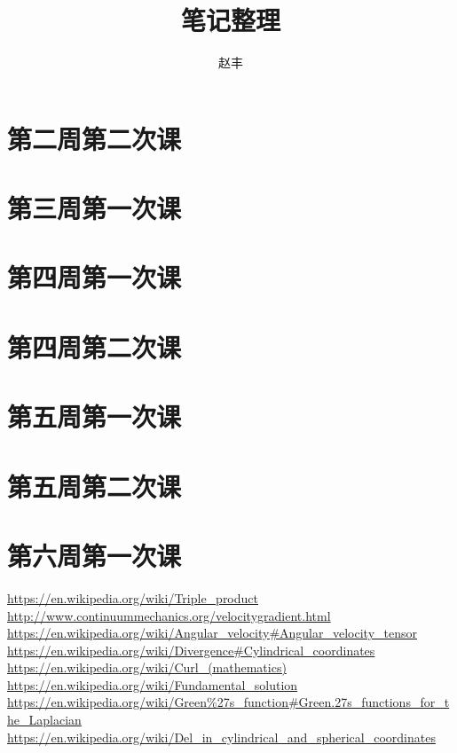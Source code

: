 \documentclass{article}
\numberwithin{equation}{section}
\begin{document}
\title{笔记整理}
\author{赵丰}
\maketitle
\tableofcontents
\section{第二周第二次课}

\section{第三周第一次课}

\section{第四周第一次课}

\section{第四周第二次课}

\section{第五周第一次课}

\section{第五周第二次课}

\section{第六周第一次课}

\begin{thebibliography}{9}
 \href{https://en.wikipedia.org/wiki/Triple_product}{https://en.wikipedia.org/wiki/Triple\_product}
\href{http://www.continuummechanics.org/velocitygradient.html}{http://www.continuummechanics.org/velocitygradient.html}
\href{https://en.wikipedia.org/wiki/Angular_velocity#Angular_velocity_tensor}{https://en.wikipedia.org/wiki/Angular\_velocity\#Angular\_velocity\_tensor}
\href{https://en.wikipedia.org/wiki/Divergence#Cylindrical_coordinates}{https://en.wikipedia.org/wiki/Divergence\#Cylindrical\_coordinates}
\href{https://en.wikipedia.org/wiki/Curl_(mathematics)}{https://en.wikipedia.org/wiki/Curl\_(mathematics)}
\href{https://en.wikipedia.org/wiki/Fundamental_solution}{https://en.wikipedia.org/wiki/Fundamental\_solution}
\href{https://en.wikipedia.org/wiki/Green\%27s_function#Green.27s_functions_for_the_Laplacian}{https://en.wikipedia.org/wiki/Green\%27s\_function\#Green.27s\_functions\_for\_the\_Laplacian}
\href{https://en.wikipedia.org/wiki/Del_in_cylindrical_and_spherical_coordinates}{https://en.wikipedia.org/wiki/Del\_in\_cylindrical\_and\_spherical\_coordinates}
\end{thebibliography}
\printglossaries
\end{document}
